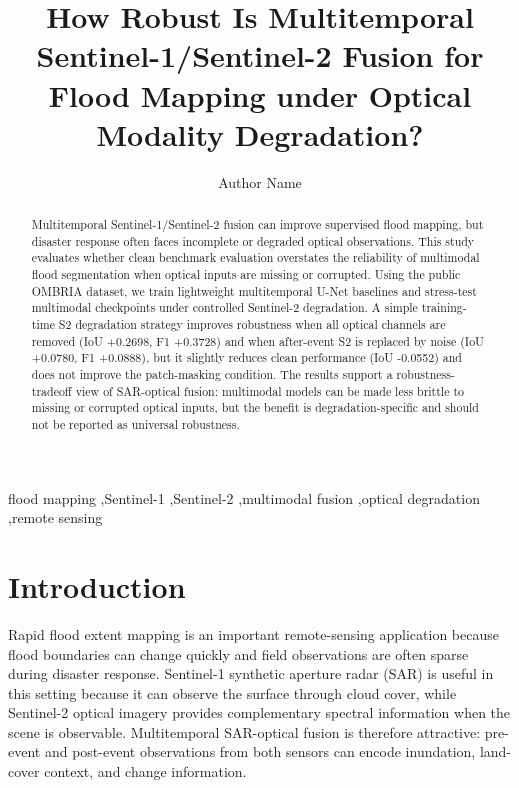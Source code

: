 \documentclass[review]{elsarticle}
\begin{document}
\begin{frontmatter}

\title{How Robust Is Multitemporal Sentinel-1/Sentinel-2 Fusion for Flood Mapping under Optical Modality Degradation?}

\author[aff1]{Author Name}

\begin{abstract}
Multitemporal Sentinel-1/Sentinel-2 fusion can improve supervised flood mapping,
but disaster response often faces incomplete or degraded optical observations.
This study evaluates whether clean benchmark evaluation overstates the
reliability of multimodal flood segmentation when optical inputs are missing or
corrupted. Using the public OMBRIA dataset, we train lightweight multitemporal
U-Net baselines and stress-test multimodal checkpoints under controlled
Sentinel-2 degradation. A simple training-time S2 degradation strategy improves
robustness when all optical channels are removed (IoU +0.2698, F1 +0.3728) and
when after-event S2 is replaced by noise (IoU +0.0780, F1 +0.0888), but it
slightly reduces clean performance (IoU -0.0552) and does not improve the
patch-masking condition. The results support a robustness-tradeoff view of
SAR-optical fusion: multimodal models can be made less brittle to missing or
corrupted optical inputs, but the benefit is degradation-specific and should not
be reported as universal robustness.
\end{abstract}

\begin{keyword}
flood mapping \sep Sentinel-1 \sep Sentinel-2 \sep multimodal fusion \sep optical degradation \sep remote sensing
\end{keyword}

\end{frontmatter}

\section{Introduction}

Rapid flood extent mapping is an important remote-sensing application because
flood boundaries can change quickly and field observations are often sparse
during disaster response. Sentinel-1 synthetic aperture radar (SAR) is useful in
this setting because it can observe the surface through cloud cover, while
Sentinel-2 optical imagery provides complementary spectral information when the
scene is observable. Multitemporal SAR-optical fusion is therefore attractive:
pre-event and post-event observations from both sensors can encode inundation,
land-cover context, and change information.
\end{document}
